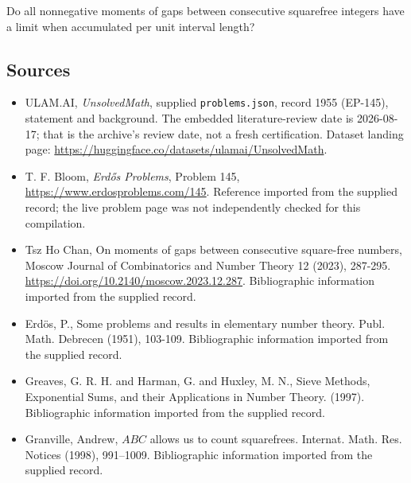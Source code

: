 \documentclass[11pt,a4paper]{article}
\begin{document}
Do all nonnegative moments of gaps between consecutive squarefree integers have a limit when accumulated per unit interval length?

\subsection{Sources}

{\small

\begin{itemize}

\item[\hypertarget{source:1955:1}{S1}] ULAM.AI, \emph{UnsolvedMath}, supplied \texttt{problems.json}, record 1955 (EP-145), statement and background. The embedded literature-review date is 2026-08-17; that is the archive’s review date, not a fresh certification. Dataset landing page: \url{https://huggingface.co/datasets/ulamai/UnsolvedMath}.

\item[\hypertarget{source:1955:2}{S2}] T. F. Bloom, \emph{Erdős Problems}, Problem 145, \url{https://www.erdosproblems.com/145}. Reference imported from the supplied record; the live problem page was not independently checked for this compilation.

\item[\hypertarget{source:1955:3}{S3}] Tsz Ho Chan, On moments of gaps between consecutive square-free numbers, Moscow Journal of Combinatorics and Number Theory 12 (2023), 287-295. \url{https://doi.org/10.2140/moscow.2023.12.287}. Bibliographic information imported from the supplied record.

\item[\hypertarget{source:1955:4}{S4}] Erd\"{o}s, P., Some problems and results in elementary number theory. Publ. Math. Debrecen (1951), 103-109. Bibliographic information imported from the supplied record.

\item[\hypertarget{source:1955:5}{S5}] Greaves, G. R. H. and Harman, G. and Huxley, M. N., Sieve Methods, Exponential Sums, and their Applications in Number Theory. (1997). Bibliographic information imported from the supplied record.

\item[\hypertarget{source:1955:6}{S6}] Granville, Andrew, {$ABC$} allows us to count squarefrees. Internat. Math. Res. Notices (1998), 991--1009. Bibliographic information imported from the supplied record.

\end{itemize}

}

\label{end:1955}
\end{document}
